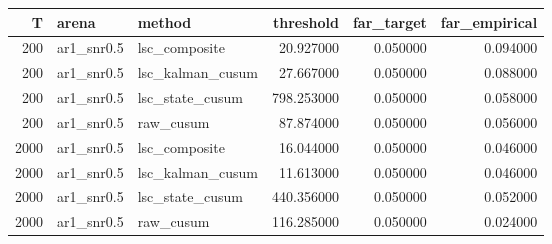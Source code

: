 \begin{tabular}{rllrrr}
\toprule
T & arena & method & threshold & far_target & far_empirical \\
\midrule
200 & ar1_snr0.5 & lsc_composite & 20.927000 & 0.050000 & 0.094000 \\
200 & ar1_snr0.5 & lsc_kalman_cusum & 27.667000 & 0.050000 & 0.088000 \\
200 & ar1_snr0.5 & lsc_state_cusum & 798.253000 & 0.050000 & 0.058000 \\
200 & ar1_snr0.5 & raw_cusum & 87.874000 & 0.050000 & 0.056000 \\
2000 & ar1_snr0.5 & lsc_composite & 16.044000 & 0.050000 & 0.046000 \\
2000 & ar1_snr0.5 & lsc_kalman_cusum & 11.613000 & 0.050000 & 0.046000 \\
2000 & ar1_snr0.5 & lsc_state_cusum & 440.356000 & 0.050000 & 0.052000 \\
2000 & ar1_snr0.5 & raw_cusum & 116.285000 & 0.050000 & 0.024000 \\
\bottomrule
\end{tabular}
